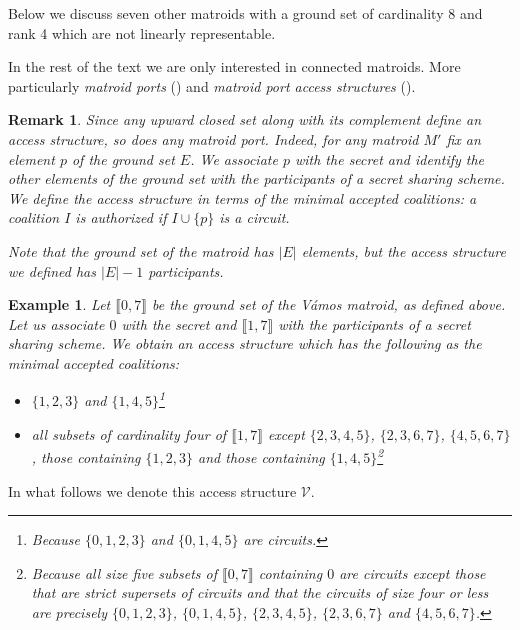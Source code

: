 \documentclass[11pt, a4paper]{kybernetika}
\newtheorem{remark}[theorem]{Remark}
\newtheorem{example}[theorem]{Example}
\begin{document}
	Below we discuss seven other matroids with a ground set of cardinality 8 and rank 4 which are not linearly representable. 
	
	In the rest of the text we are only interested in connected matroids. More particularly \emph{matroid ports} (\cite{seymour1976forbidden}) and \emph{matroid port access structures} (\cite{farras2020secret}).
	
	\begin{remark}
		Since any upward closed set along with its complement define an access structure, so does any matroid port. Indeed, for any matroid $M'$ fix an element $p$ of the ground set $E$. We associate $p$ with the secret and identify the other elements of the ground set with the participants of a secret sharing scheme. We define the access structure in terms of the minimal accepted coalitions: a coalition $I$ is authorized if $I\cup\{p\}$ is a circuit.
		
		Note that the ground set of the matroid has $|E|$ elements, but the access structure we defined has $|E|-1$ participants.
	\end{remark}
	
	\begin{example}
	Let $\llbracket0,7\rrbracket$ be the ground set of the V\'amos matroid, as defined above.
	Let us associate $0$ with the secret and $\llbracket1,7\rrbracket$ with the participants of a secret sharing scheme. We obtain an access structure which has the following as the minimal accepted coalitions:
	\begin{itemize}
		\item $\{1,2,3\}$ and $\{1,4,5\}$\footnote{Because $\{0,1,2,3\}$ and $\{0,1,4,5\}$ are circuits.}
		\item all subsets of cardinality four of $\llbracket1,7\rrbracket$ except $\{2,3,4,5\}$, $\{2,3,6,7\}$, $\{4,5,6,7\}$, those containing $\{1,2,3\}$ and those containing $\{1,4,5\}$\footnote{Because all size five subsets of $\llbracket0,7\rrbracket$ containing $0$ are circuits except those that are strict supersets of circuits and that the circuits of size four or less are precisely $\{0,1,2,3\}$, $\{0,1,4,5\}$, $\{2,3,4,5\}$, $\{2,3,6,7\}$ and $\{4,5,6,7\}$.}
	\end{itemize}
	\end{example}

	In what follows we denote this access structure $\mathcal{V}$.
	
\end{document}
